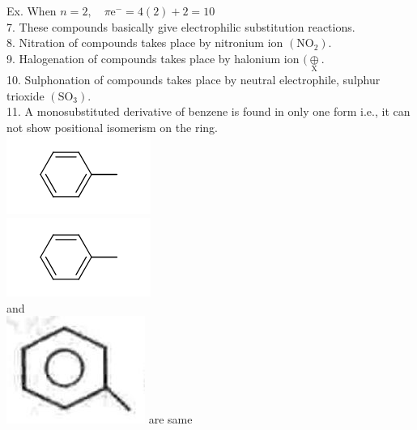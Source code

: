 \documentclass[10pt]{article}
\begin{document}
Ex. When $n=2, \quad \pi \mathrm{e}^{-}=4(2)+2=10$\\
7. These compounds basically give electrophilic substitution reactions.\\
8. Nitration of compounds takes place by nitronium ion $\left(\mathrm{NO}_{2}\right)$.\\
9. Halogenation of compounds takes place by halonium ion $(\underset{\mathrm{X}}{\oplus}$.\\
10. Sulphonation of compounds takes place by neutral electrophile, sulphur trioxide $\left(\mathrm{SO}_{3}\right)$.\\
11. A monosubstituted derivative of benzene is found in only one form i.e., it can not show positional isomerism on the ring.\\
\includegraphics{smile-27dd68fd4363cef29c5755a9739e2809e461a7b3}\\
\includegraphics{smile-1d8f1b45660bf5f896c2f8b40b7213d7eeaba1de}\\
and\\
\includegraphics[max width=\textwidth]{2025_01_28_8470952b98110cec3aabg-201(2)} are same\\
\end{document}
